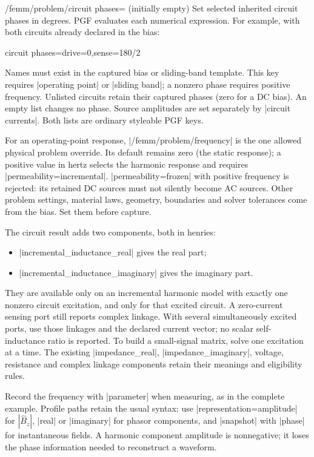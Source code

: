 \newpage
\begin{key}{/femm/problem/circuit phases= (initially empty)}
Set selected inherited circuit phases in degrees. PGF evaluates each numerical
expression. For example, with both circuits already declared in the bias:
\begin{codeexample}
circuit phases={drive=0,sense=180/2}
\end{codeexample}
Names must exist in the captured bias or sliding-band template. This key
requires |operating point| or |sliding band|; a nonzero phase requires positive
frequency. Unlisted circuits retain their captured phases (zero for a DC bias).
An empty list changes no phase. Source amplitudes are set
separately by |circuit currents|. Both lists are ordinary styleable PGF keys.
\end{key}

For an operating-point response, |/femm/problem/frequency| is the one allowed physical
problem override. Its default remains zero (the static response); a positive
value in hertz selects the harmonic response and requires
|permeability=incremental|. |permeability=frozen| with positive frequency is
rejected: its retained DC sources must not silently become AC sources. Other
problem settings, material laws, geometry, boundaries and solver tolerances
come from the bias. Set them before capture.

The circuit result adds two components, both in henries:
\begin{itemize}
\item |incremental_inductance_real| gives the real part;
\item |incremental_inductance_imaginary| gives the imaginary part.
\end{itemize}
They are available only on
an incremental harmonic model with exactly one nonzero circuit excitation,
and only for that excited circuit. A zero-current sensing port still reports
complex linkage. With several simultaneously excited ports, use those linkages
and the declared current vector; no scalar self-inductance ratio is reported.
To build a small-signal matrix, solve one excitation at a time. The existing
|impedance_real|, |impedance_imaginary|, voltage, resistance and complex linkage
components retain their meanings and eligibility rules.
\begin{codeexample}
\femmresultplot[results={port-low-5,port-low-10,port-low-20},
  component=incremental_inductance_real,
  plot options={blue!65!black,thick,mark=*}]
\end{codeexample}
Record the frequency with |parameter| when measuring, as in the complete
example. Profile paths retain the usual syntax; use |representation=amplitude|
for $|\widehat B_z|$, |real| or |imaginary| for phasor components, and |snapshot|
with |phase| for instantaneous fields. A harmonic component amplitude is
nonnegative; it loses the phase information needed to reconstruct a waveform.

